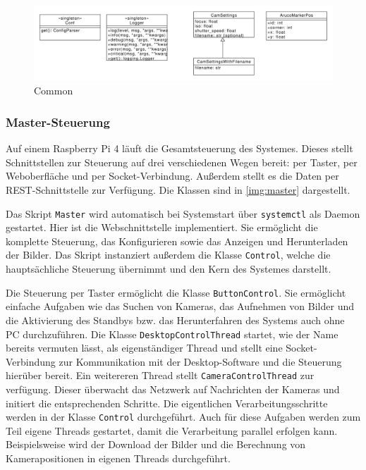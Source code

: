 \documentclass[./00PhotoBox.tex]{subfiles}
\begin{document}
\begin{figure}
  \centering
  \includegraphics[width=1\textwidth]{./img/uml/uml_common_classdiagramm.pdf}
  \caption{Common} %
  \label{img:uml_common} %
\end{figure}


\subsubsection{Master-Steuerung}

Auf einem Raspberry Pi 4 läuft die Gesamt\-steuerung des Systemes. Dieses stellt Schnitt\-stellen zur Steuerung auf drei verschiedenen Wegen bereit: per Taster, per Weboberfläche und per Socket-Verbindung. Außerdem stellt es die Daten per REST-Schnittstelle zur Verfügung. Die Klassen sind in \autoref{img:master} dargestellt.

Das Skript \texttt{Master} wird automatisch bei Systemstart über \texttt{systemctl} als Daemon gestartet. Hier ist die Webschnittstelle implementiert. Sie ermöglicht die komplette Steuerung, das Konfigurieren sowie das Anzeigen und Herunterladen der Bilder. Das Skript instanziert außerdem die Klasse \texttt{Control}, welche die hauptsächliche Steuerung übernimmt und den Kern des Systemes darstellt.

Die Steuerung per Taster ermöglicht die Klasse \texttt{ButtonControl}. Sie ermöglicht einfache Aufgaben wie das Suchen von Kameras, das Aufnehmen von Bilder und die Aktivierung des Standbys bzw. das Herunterfahren des Systems auch ohne PC durchzuführen. Die Klasse \texttt{DesktopControlThread} startet, wie der Name bereits vermuten lässt, als eigenständiger Thread und stellt eine Socket-Verbindung zur Kommunikation mit der Desktop-Software und die Steuerung hierüber bereit. Ein weitereren Thread stellt \texttt{CameraControlThread} zur verfügung. Dieser überwacht das Netzwerk auf Nachrichten der Kameras und initiert die entsprechenden Schritte. Die eigentlichen Verarbeitungsschritte werden in der Klasse \texttt{Control} durchgeführt. Auch für diese Aufgaben werden zum Teil eigene Threads gestartet, damit die Verarbeitung parallel erfolgen kann. Beispielsweise wird der Download der Bilder und die Berechnung von Kamerapositionen in eigenen Threads durchgeführt.
\end{document}
